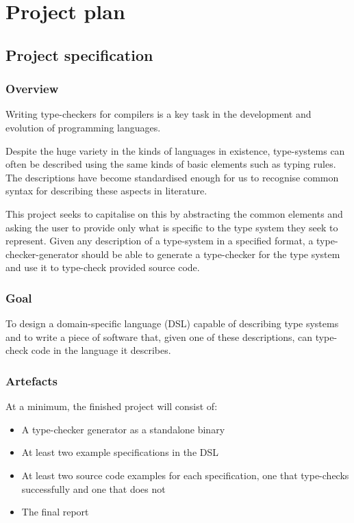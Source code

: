 \chapter{Project plan}

\section{Project specification}

  \subsection{Overview}

  Writing type-checkers for compilers is a key task in the
  development and evolution of programming languages.

  Despite the huge variety in the kinds of languages in existence,
  type-systems can often be described using the same kinds of
  basic elements such as typing rules. The descriptions have become
  standardised enough for us to recognise common syntax for
  describing these aspects in literature.

  This project seeks to capitalise on this by abstracting
  the common elements and asking the user to provide only what is
  specific to the type system they seek to represent. Given any
  description of a type-system in a specified format, a
  type-checker-generator should be able to generate a
  type-checker for the type system and use it to type-check provided
  source code.
  
  \subsection{Goal}

  To design a domain-specific language (DSL) capable of describing type systems and to
  write a piece of software that, given one of these
  descriptions, can type-check code in the language
  it describes.

  \subsection{Artefacts}
  \label{section-artifacts}

  At a minimum, the finished project will consist of:

  \begin{itemize}
  \item A type-checker generator as a standalone binary
  \item At least two example specifications in the DSL
  \item At least two source code examples for each
    specification, one that type-checks successfully and one
    that does not
  \item The final report
  \end{itemize}
  
